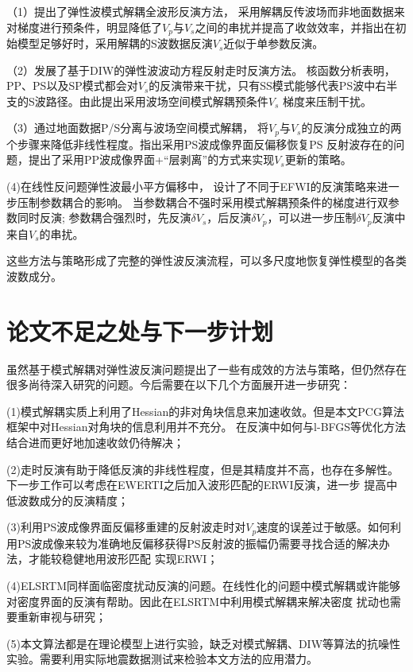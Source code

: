 （1）提出了弹性波模式解耦全波形反演方法，
采用解耦反传波场而非地面数据来对梯度进行预条件，明显降低了$V_p$与$V_s$之间的串扰并提高了收敛效率，并指出在初始模型足够好时，采用解耦的S波数据反演$V_s$近似于单参数反演。

（2）发展了基于DIW的弹性波波动方程反射走时反演方法。
核函数分析表明，PP、PS以及SP模式都会对$V_s$的反演带来干扰，只有SS模式能够代表PS波中右半支的S波路径。由此提出采用波场空间模式解耦预条件$V_s$
梯度来压制干扰。


（3）通过地面数据P/S分离与波场空间模式解耦，
将$V_p$与$V_s$的反演分成独立的两个步骤来降低非线性程度。指出采用PS波成像界面反偏移恢复PS
反射波存在的问题，提出了采用PP波成像界面+“层剥离”的方式来实现$V_s$更新的策略。

(4)在线性反问题弹性波最小平方偏移中，
设计了不同于EFWI的反演策略来进一步压制参数耦合的影响。
当参数耦合不强时采用模式解耦预条件的梯度进行双参数同时反演;
参数耦合强烈时，先反演$\delta V_s$，后反演$\delta V_p$，可以进一步压制$\delta
V_p$反演中来自$V_s$的串扰。

这些方法与策略形成了完整的弹性波反演流程，可以多尺度地恢复弹性模型的各类波数成分。

\section{论文不足之处与下一步计划}
虽然基于模式解耦对弹性波反演问题提出了一些有成效的方法与策略，但仍然存在很多尚待深入研究的问题。今后需要在以下几个方面展开进一步研究：

(1)模式解耦实质上利用了Hessian的非对角块信息来加速收敛。但是本文PCG算法框架中对Hessian对角块的信息利用并不充分。
在反演中如何与l-BFGS等优化方法结合进而更好地加速收敛仍待解决；

(2)走时反演有助于降低反演的非线性程度，但是其精度并不高，也存在多解性。下一步工作可以考虑在EWERTI之后加入波形匹配的ERWI反演，进一步
提高中低波数成分的反演精度；

(3)利用PS波成像界面反偏移重建的反射波走时对$V_p$速度的误差过于敏感。如何利用PS波成像来较为准确地反偏移获得PS反射波的振幅仍需要寻找合适的解决办法，才能较稳健地用波形匹配
实现ERWI；

(4)ELSRTM同样面临密度扰动反演的问题。在线性化的问题中模式解耦或许能够对密度界面的反演有帮助。因此在ELSRTM中利用模式解耦来解决密度
扰动也需要重新审视与研究；

(5)本文算法都是在理论模型上进行实验，缺乏对模式解耦、DIW等算法的抗噪性实验。需要利用实际地震数据测试来检验本文方法的应用潜力。
